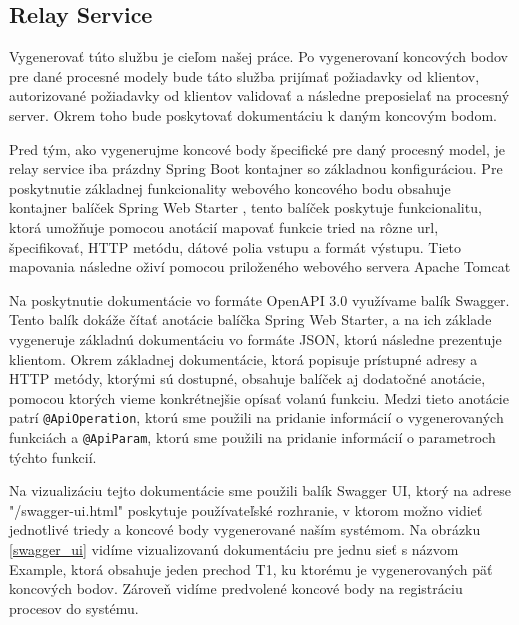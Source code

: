 \subsection{Relay Service}

Vygenerovať túto službu je cieľom našej práce. Po vygenerovaní koncových bodov pre dané procesné modely bude táto služba prijímať požiadavky od klientov, autorizované požiadavky od klientov validovať a následne preposielať na procesný server. Okrem toho bude poskytovať dokumentáciu k daným koncovým bodom.

Pred tým, ako vygenerujme koncové body špecifické pre daný procesný model, je relay service iba prázdny Spring Boot kontajner so základnou konfiguráciou. Pre poskytnutie základnej funkcionality webového koncového bodu obsahuje kontajner balíček Spring Web Starter \cite{webstarter}, tento balíček poskytuje funkcionalitu, ktorá umožňuje pomocou anotácií mapovať funkcie tried na rôzne \acrshort{url}, špecifikovať, HTTP metódu, dátové polia vstupu a formát výstupu. Tieto mapovania následne oživí pomocou priloženého webového servera Apache Tomcat \cite{tomcat}


Na poskytnutie dokumentácie vo formáte OpenAPI 3.0 \cite{openapi} využívame balík Swagger. Tento balík dokáže čítať anotácie balíčka Spring Web Starter, a na ich základe vygeneruje základnú dokumentáciu vo formáte JSON, ktorú následne prezentuje klientom. Okrem základnej dokumentácie, ktorá popisuje prístupné adresy a HTTP metódy, ktorými sú dostupné, obsahuje balíček aj dodatočné anotácie, pomocou ktorých vieme konkrétnejšie opísať volanú funkciu. Medzi tieto anotácie patrí \texttt{@ApiOperation}, ktorú sme použili na pridanie informácií o vygenerovaných funkciách a \texttt{@ApiParam}, ktorú sme použili na pridanie informácií o parametroch týchto funkcií.

Na vizualizáciu tejto dokumentácie sme použili balík Swagger UI, ktorý na adrese "/swagger-ui.html" poskytuje používateľské rozhranie, v ktorom možno vidieť jednotlivé triedy a koncové body vygenerované naším systémom. Na obrázku \ref{swagger_ui} vidíme vizualizovanú dokumentáciu pre jednu sieť s názvom Example, ktorá obsahuje jeden prechod T1, ku ktorému je vygenerovaných päť koncových bodov. Zároveň vidíme predvolené koncové body na registráciu procesov do systému.

